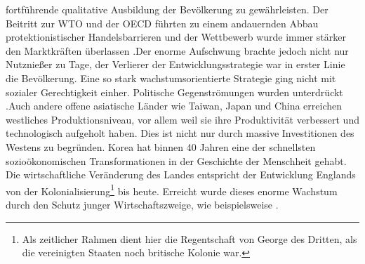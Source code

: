 fortf{\"u}hrende qualitative Ausbildung der Bev{\"o}lkerung zu gew{\"a}hrleisten. Der Beitritt zur WTO und der OECD f{\"u}hrten zu einem andauernden Abbau protektionistischer Handelsbarrieren und der Wettbewerb wurde immer st{\"a}rker den Marktkr{\"a}ften {\"u}berlassen \citep{Engelhard.2004}.\newline Der enorme Aufschwung brachte jedoch nicht nur Nutznie{\ss}er zu Tage, der Verlierer der Entwicklungsstrategie war in erster Linie die Bev{\"o}lkerung. Eine so stark wachstumsorientierte Strategie ging nicht mit sozialer Gerechtigkeit einher. Politische Gegenstr{\"o}mungen wurden unterdr{\"u}ckt \citep{Engelhard.2004}.\newline Auch andere offene asiatische L{\"a}nder wie Taiwan, Japan und China erreichen westliches Produktionsniveau, vor allem weil sie ihre Produktivit{\"a}t verbessert und technologisch aufgeholt haben. Dies ist nicht nur durch massive Investitionen des Westens zu begr{\"u}nden. Korea hat binnen 40 Jahren eine der schnellsten sozio{\"o}konomischen Transformationen in der Geschichte der Menschheit gehabt. Die wirtschaftliche Ver{\"a}nderung des Landes entspricht der Entwicklung Englands von der Kolonialisierung\footnote{Als zeitlicher Rahmen dient hier die Regentschaft von George des Dritten, als die vereinigten Staaten noch britische Kolonie war.} bis heute. Erreicht wurde dieses enorme Wachstum durch den Schutz junger Wirtschaftszweige, wie beispielsweise \citep{Lee.1999}.\newline


